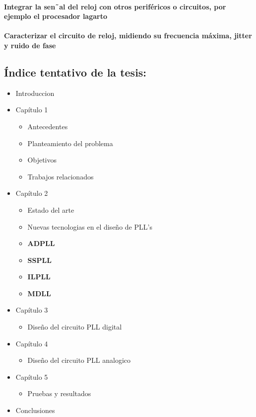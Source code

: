 \documentclass[runningheads,a4paper]{llncs}
\begin{document}
\paragraph{Integrar la sen˜al del reloj con otros periféricos o circuitos, por ejemplo el procesador lagarto}
\paragraph{Caracterizar el circuito de reloj, midiendo su frecuencia máxima, jitter y ruido de fase}


\subsection{Índice tentativo de la tesis:}
\begin{itemize}
\item Introduccion
\item Capítulo 1
\begin{itemize}
    \item Antecedentes
    \item Planteamiento del problema
    \item Objetivos
    \item Trabajos relacionados
\end{itemize}
\item Capítulo 2
\begin{itemize}
    \item Estado del arte
    \item Nuevas tecnologias en el diseño de PLL's
    \item \textbf{ADPLL}
    \item \textbf{SSPLL}
    \item \textbf{ILPLL}
    \item \textbf{MDLL}
\end{itemize}
\item Capítulo 3
\begin{itemize}
    \item Diseño del circuito PLL digital
\end{itemize}
\item Capítulo 4
\begin{itemize}
    \item Diseño del circuito PLL analogico
\end{itemize}
\item Capítulo 5
\begin{itemize}
    \item Pruebas y resultados
\end{itemize}
\item Conclusiones
\end{itemize}
\end{document}
